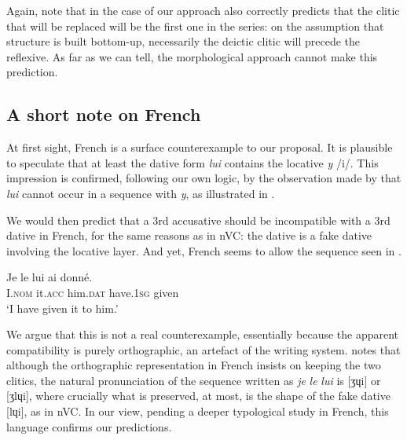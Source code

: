 \documentclass[output=paper,modfonts,nonflat,newtxmath,colorlinks,citecolor=brown]{langsci/langscibook}
\begin{document}
Again, note that in the case of  our approach also correctly predicts that the clitic that will be replaced will be the first one in the series: on the assumption that structure is built bottom-up, necessarily the deictic clitic will precede the reflexive. As far as we can tell, the morphological approach cannot make this prediction.

\subsection{A short note on French} %
\label{sec:cabre:3.3}

At first sight, French is a surface counterexample to our proposal. It is plausible to speculate that at least the dative form \textit{lui} contains the locative \textit{y} /i/. This impression is confirmed, following our own logic, by the observation made by \citet{Rezac2010} that \textit{lui} cannot occur in a sequence with \textit{y}, as illustrated in .

 \z

We would then predict that a 3rd accusative should be incompatible with a 3rd dative in French, for the same reasons as in nVC: the dative is a fake dative involving the locative layer. And yet, French seems to allow the sequence seen in . %

\ea%
    \label{ex:cabre:30}
    \gll Je le     lui    ai     donné.\\
         I.\textsc{nom} it.\textsc{acc} him.\textsc{dat}   have.\textsc{1sg} given\\
    \glt `I have given it to him.'
    \z

We argue that this is not a real counterexample, essentially because the apparent compatibility is purely orthographic, an artefact of the writing system. \citet{Schwarze2001} notes that although the orthographic representation in French insists on keeping the two clitics, the natural pronunciation of the sequence written as \textit{je} \textit{le} \textit{lui} is [ʒɥi] or [ʒlɥi], where crucially what is preserved, at most, is the shape of the fake dative [lɥi], as in nVC. In our view, pending a deeper typological study in French, this language confirms our predictions.
\end{document}
